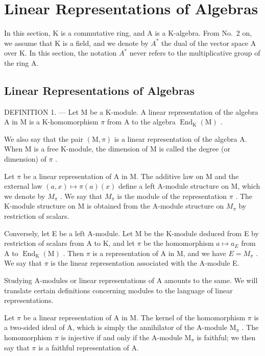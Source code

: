 \section{Linear Representations of Algebras}

In this section, K is a commutative ring, and A is a K-algebra. From No.~2 on, we assume that K is a field, and we denote by \(A^{*}\) the dual of the vector space A over K. In this section, the notation \(A^{*}\) never refers to the multiplicative group of the ring A.

\subsection{Linear Representations of Algebras}

DEFINITION 1. --- Let M be a K-module. A linear representation of the algebra A in M is a K-homomorphism \(\pi\) from A to the algebra \(\operatorname{End}_{\mathrm{K}}(\mathrm{M})\) .

We also say that the pair \((\mathrm{M},\pi)\) is a linear representation of the algebra A. When M is a free K-module, the dimension of M is called the degree (or dimension) of \(\pi\) .

Let \(\pi\) be a linear representation of A in M. The additive law on M and the external law \((a,x)\mapsto\pi(a)(x)\) define a left A-module structure on M, which we denote by \(M_{\pi}\) . We say that \(M_{\pi}\) is the module of the representation \(\pi\) . The K-module structure on M is obtained from the A-module structure on \(M_{\pi}\) by restriction of scalars.

Conversely, let E be a left A-module. Let M be the K-module deduced from E by restriction of scalars from A to K, and let \(\pi\) be the homomorphism \(a \mapsto a_{E}\) from A to \(\operatorname{End}_{\mathrm{K}}(\mathrm{M})\) . Then \(\pi\) is a representation of A in M, and we have \(E = M_{\pi}\) . We say that \(\pi\) is the linear representation associated with the A-module E.

Studying A-modules or linear representations of A amounts to the same. We will translate certain definitions concerning modules to the language of linear representations.

Let \(\pi\) be a linear representation of A in M. The kernel of the homomorphism \(\pi\) is a two-sided ideal of A, which is simply the annihilator of the A-module \(\mathrm{M}_{\pi}\) . The homomorphism \(\pi\) is injective if and only if the A-module \(\mathrm{M}_{\pi}\) is faithful; we then say that \(\pi\) is a faithful representation of A.

